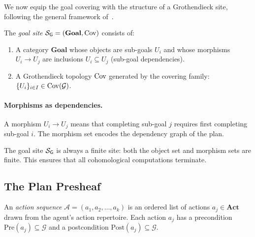 \documentclass[11pt]{article}
\newcommand{\GoalSite}{\Site_{\mathsf{G}}}
\newcommand{\SubGoal}[1]{U_{#1}}
\newcommand{\ActionSeq}{\mathcal{A}}
\newcommand{\PreCond}{\mathrm{Pre}}
\newcommand{\PostCond}{\mathrm{Post}}
\newcommand{\GoalSpace}{\mathcal{G}}
\newcommand{\CoverFam}{\{U_i\}_{i \in I}}
\newcommand{\GoalCat}{\mathbf{Goal}}
\newcommand{\ActCat}{\mathbf{Act}}
\begin{document}
We now equip the goal covering with the structure of a Grothendieck
site, following the general framework of~\cite{paper01,paper03}.

\begin{definition}\label{def:goal-site}
  The \emph{goal site} $\GoalSite = (\GoalCat, \Cov)$ consists of:
  \begin{enumerate}[leftmargin=*,itemsep=1pt]
    \item A category $\GoalCat$ whose objects are sub-goals
      $\SubGoal{i}$ and whose morphisms $\SubGoal{i} \to \SubGoal{j}$
      are inclusions $\SubGoal{i} \subseteq \SubGoal{j}$ (sub-goal
      dependencies).
    \item A Grothendieck topology $\mathrm{Cov}$ generated by the covering
      family: $\CoverFam \in \Cov(\GoalSpace)$.
  \end{enumerate}
\end{definition}

\paragraph{Morphisms as dependencies.}
A morphism $\SubGoal{i} \to \SubGoal{j}$ means that completing
sub-goal $j$ requires first completing sub-goal $i$.  The morphism
set encodes the dependency graph of the plan.

\begin{remark}
  The goal site $\GoalSite$ is always a finite site: both the
  object set and morphism sets are finite.  This ensures that all
  cohomological computations terminate.
\end{remark}

\subsection{The Plan Presheaf}\label{ssec:plan-presheaf}

\begin{definition}\label{def:action-seq}
  An \emph{action sequence} $\ActionSeq = (a_1, a_2, \ldots, a_k)$
  is an ordered list of actions $a_j \in \ActCat$ drawn from the
  agent's action repertoire.  Each action $a_j$ has a
  precondition $\PreCond(a_j) \subseteq \GoalSpace$ and a
  postcondition $\PostCond(a_j) \subseteq \GoalSpace$.
\end{definition}
\end{document}
